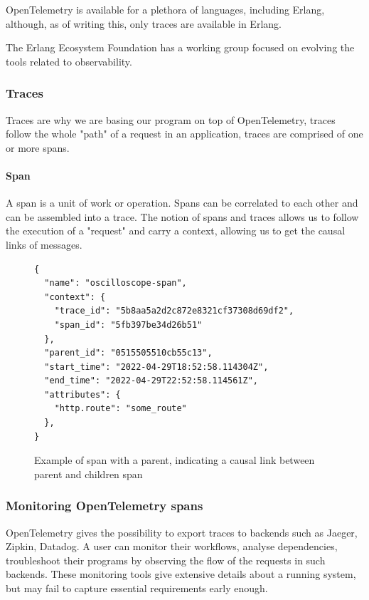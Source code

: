    OpenTelemetry is available for a plethora of languages, including Erlang, although, as of writing this, only traces are available in Erlang.
     
    The Erlang Ecosystem Foundation has a working group focused on evolving the tools related to observability. 
    
    \subsubsection{Traces}
        Traces are why we are basing our program on top of OpenTelemetry, traces follow the whole "path" of a request in an application, traces are comprised of one or more spans.
        
        \paragraph{Span} A span is a unit  of work or operation. Spans can be correlated to each other and can be assembled into a trace.
    The notion of spans and traces allows us to follow the execution of a "request" and carry a context, allowing us to get the causal links of messages. \cite{otel-t} 
    \begin{figure}[H]
    \begin{verbatim} 
{
  "name": "oscilloscope-span",
  "context": {
    "trace_id": "5b8aa5a2d2c872e8321cf37308d69df2",
    "span_id": "5fb397be34d26b51"
  },
  "parent_id": "0515505510cb55c13",
  "start_time": "2022-04-29T18:52:58.114304Z",
  "end_time": "2022-04-29T22:52:58.114561Z",
  "attributes": {
    "http.route": "some_route"
  },
}
    \end{verbatim}

    \caption{Example of span with a parent, indicating a causal link between parent and children span \cite{otel-t}}

    \end{figure}

    \subsubsection{Monitoring OpenTelemetry spans}
            OpenTelemetry gives the possibility to export traces to backends such as Jaeger, Zipkin, Datadog. A user can monitor their workflows, analyse dependencies, troubleshoot their programs by observing the flow of the requests in such backends\cite{jg}. These monitoring tools give extensive details about a running system, but may fail to capture essential requirements early enough.
       
